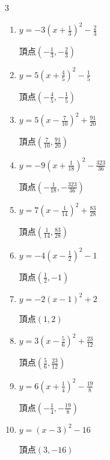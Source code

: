 \begin{multicols}{3}
\begin{enumerate}
        $\displaystyle 頂点\left( \frac{1}{3} , \frac{13}{3} \right)$

  \item $\displaystyle y=-3\left( x+\frac{1}{3}\right)^{2}-\frac{2}{3}$

        $\displaystyle 頂点\left( -\frac{1}{3} , -\frac{2}{3} \right)$

  \item $\displaystyle y=5\left( x+\frac{4}{5}\right)^{2}-\frac{1}{5}$

        $\displaystyle 頂点\left( -\frac{4}{5} , -\frac{1}{5} \right)$

  \item $\displaystyle y=5\left( x-\frac{7}{10}\right)^{2}+\frac{91}{20}$

        $\displaystyle 頂点\left( \frac{7}{10} , \frac{91}{20} \right)$

  \item $\displaystyle y=-9\left( x+\frac{1}{18}\right)^{2}-\frac{323}{36}$

        $\displaystyle 頂点\left( -\frac{1}{18} , -\frac{323}{36} \right)$

  \item $\displaystyle y=7\left( x-\frac{1}{14}\right)^{2}+\frac{83}{28}$

        $\displaystyle 頂点\left( \frac{1}{14} , \frac{83}{28} \right)$

  \item $\displaystyle y=-4\left( x-\frac{1}{2}\right)^{2}-1$

        $\displaystyle 頂点\left( \frac{1}{2} , -1 \right)$

  \item $\displaystyle y=-2\left( x-1\right)^{2}+2$

        $\displaystyle 頂点\left( 1 , 2 \right)$

  \item $\displaystyle y=3\left( x-\frac{5}{6}\right)^{2}+\frac{23}{12}$

        $\displaystyle 頂点\left( \frac{5}{6} , \frac{23}{12} \right)$

  \item $\displaystyle y=6\left( x+\frac{1}{4}\right)^{2}-\frac{19}{8}$

        $\displaystyle 頂点\left( -\frac{1}{4} , -\frac{19}{8} \right)$

  \item $\displaystyle y=\left( x-3\right)^{2}-16$

        $\displaystyle 頂点\left( 3 , -16 \right)$


\end{enumerate}
\end{multicols}
